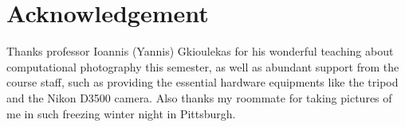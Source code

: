 \documentclass[final]{cvpr}
\begin{document}
\section{Acknowledgement}

Thanks professor Ioannis (Yannis) Gkioulekas for his wonderful teaching 
about computational photography this semester, as well as abundant 
support from the course staff, such as providing the essential hardware
equipments like the tripod and the Nikon D3500 camera. Also 
thanks my roommate for taking pictures of me in such freezing winter night 
in Pittsburgh.


{\small


}
\end{document}
